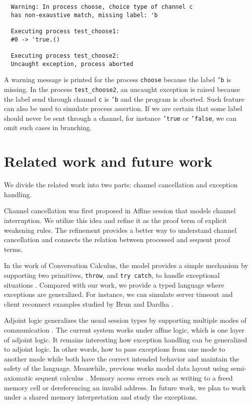 \documentclass[12pt, openany]{memoir}
\begin{document}
\begin{verbatim}
  Warning: In process choose, choice type of channel c
  has non-exaustive match, missing label: 'b
  
  Executing process test_choose1:
  #0 -> 'true.()

  Executing process test_choose2:
  Uncaught exception, process aborted
\end{verbatim}
A warning message is printed for the process \texttt{choose} because the label \texttt{'b} is missing.
In the process \texttt{test\_choose2}, an uncaught exception is raised because the label send through channel \texttt{c} is \texttt{'b}
and the program is aborted. Such feature can also be used to simulate process assertion. 
If we are certain that some label should never be sent through a channel, for instance \texttt{'true} or \texttt{'false},
we can omit such cases in branching.
\section{Related work and future work}
We divide the related work into two parts: channel cancellation and exception handling.

Channel cancellation was first proposed in Affine session that models channel interruption.
We utilize this idea and refine it as the proof term of explicit weakening rules.
The refinement provides a better way to understand channel cancellation
and connects the relation between processed and sequent proof terms.

In the work of Conversation Calculus, the model provides a simple mechanism by supporting two primitives, \texttt{throw},
and \texttt{try catch}, to handle exceptional situations \cite{Vieira2008}. Compared with our work,
we provide a typed language where exceptions are generalized. For instance,
we can simulate server timeout and client reconnect examples studied by Brun and Dardha \cite{Brun2023}.

Adjoint logic generalizes the usual session types by supporting multiple modes of communication \cite{Klaas2019}.
The current system works under affine logic, which is one layer of adjoint logic.
It remains interesting how exception handling can be generalized to adjoint logic.
In other words, how to pass exceptions from one mode to another mode while both have the correct intended behavior and
maintain the safety of the language. Meanwhile, previous works model data layout using
semi-axiomatic sequent calculus \cite{DeYoung2023}. Memory access errors such as
writing to a freed memory cell or dereferencing an invalid address. In future work,
we plan to work under a shared memory interpretation and study the exceptions.
\end{document}
